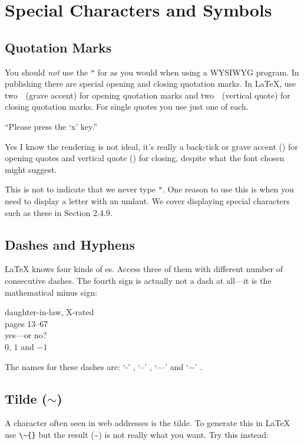 \section{Special Characters and Symbols}

\subsection{Quotation Marks}

You should \emph{not} use the \verb|"| for 
 as you would when using a WYSIWYG program.  In publishing
there are special opening and closing quotation marks.  In \LaTeX{},
use two~\textasciigrave~(grave accent) for opening quotation marks and
two~\textquotesingle~(vertical quote) for closing quotation marks. For single
quotes you use just one of each.
\begin{example}
``Please press the `x' key.''
\end{example}
Yes I know the rendering is not ideal, it's really a back-tick or grave accent
(\textasciigrave) for
opening quotes and vertical quote (\textquotesingle) for closing, despite what the font chosen might suggest.

This is not to indicate that we never type \verb|"|. One reason to use this is
when you need to display a letter with an umlaut. We cover displaying
special characters such as these in Section 2.4.9.
\subsection{Dashes and Hyphens}

\LaTeX{} knows four kinds of es. Access three of
them with different number of consecutive dashes. The fourth sign
is actually not a dash at all---it is the mathematical minus sign: \index{-}
\index{--} \index{---}  

\begin{example}
daughter-in-law, X-rated\\
pages 13--67\\
yes---or no? \\
$0$, $1$ and $-1$
\end{example}
The names for these dashes are:
`-' , `--' , `---'  and
`$-$' .

\subsection{Tilde (\(\sim\))}
A character often seen in web addresses is the tilde. To generate
this in \LaTeX{} use \verb|\~{}| but the result (\~{}) is not really
what you want. Try this instead:

